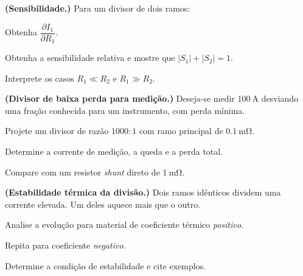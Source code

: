 \begin{questao}[4]{}

\textbf{(Sensibilidade.)} Para um divisor de dois ramos:
\begin{itensq}
\item Obtenha $\dfrac{\partial I_1}{\partial R_1}$.
\item Obtenha a sensibilidade relativa e mostre que $|S_1|+|S_2|=1$.
\item Interprete os casos $R_1\ll R_2$ e $R_1\gg R_2$.
\end{itensq}


\end{questao}
\begin{questao}[4]{}

\textbf{(Divisor de baixa perda para medição.)} Deseja-se medir
$\SI{100}{\ampere}$ desviando uma fração conhecida para um instrumento, com
perda mínima.
\begin{itensq}
\item Projete um divisor de razão $1000{:}1$ com ramo principal de
      $\SI{0.1}{\milli\ohm}$.
\item Determine a corrente de medição, a queda e a perda total.
\item Compare com um resistor \emph{shunt} direto de $\SI{1}{\milli\ohm}$.
\end{itensq}


\end{questao}
\begin{questao}[4]{}

\textbf{(Estabilidade térmica da divisão.)} Dois ramos idênticos dividem uma
corrente elevada. Um deles aquece mais que o outro.
\begin{itensq}
\item Analise a evolução para material de coeficiente térmico \emph{positivo}.
\item Repita para coeficiente \emph{negativo}.
\item Determine a condição de estabilidade e cite exemplos.
\end{itensq}


\end{questao}
